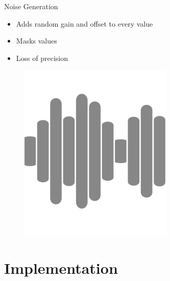 \documentclass[aspectratio=169]{beamer}
[aspectratio=169] %
\begin{document}
\begin{frame}{Noise Generation}
  \begin{minipage}{0.49\textwidth} 
    \begin{itemize}
      \item Adds random gain and offset to every value
      \item Masks values
      \item Loss of precision
    \end{itemize}
  \end{minipage}
  \hfill
  \begin{minipage}{0.49\textwidth} 
    \begin{figure}
      \centering
      \includegraphics[height=0.5\textheight]{figures/noise.png}
    \end{figure}
  \end{minipage}
\end{frame}


\section{Implementation}
\end{document}
